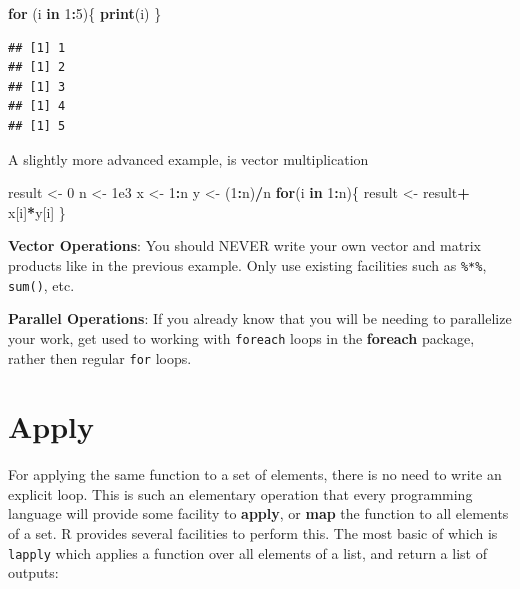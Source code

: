 \documentclass[]{book}
\newenvironment{Shaded}{\begin{snugshade}}{\end{snugshade}}
\newcommand{\ControlFlowTok}[1]{\textcolor[rgb]{0.13,0.29,0.53}{\textbf{#1}}}
\newcommand{\DecValTok}[1]{\textcolor[rgb]{0.00,0.00,0.81}{#1}}
\newcommand{\FloatTok}[1]{\textcolor[rgb]{0.00,0.00,0.81}{#1}}
\newcommand{\KeywordTok}[1]{\textcolor[rgb]{0.13,0.29,0.53}{\textbf{#1}}}
\newcommand{\NormalTok}[1]{#1}
\newcommand{\OperatorTok}[1]{\textcolor[rgb]{0.81,0.36,0.00}{\textbf{#1}}}
\newcommand{\StringTok}[1]{\textcolor[rgb]{0.31,0.60,0.02}{#1}}
\theoremstyle{definition}
\theoremstyle{definition}
\theoremstyle{definition}
\theoremstyle{remark}
\let\BeginKnitrBlock\begin \let\EndKnitrBlock\end
\begin{document}
\begin{Shaded}
\begin{Highlighting}[]
\ControlFlowTok{for}\NormalTok{ (i }\ControlFlowTok{in} \DecValTok{1}\OperatorTok{:}\DecValTok{5}\NormalTok{)\{}
    \KeywordTok{print}\NormalTok{(i)}
\NormalTok{    \}}
\end{Highlighting}
\end{Shaded}

\begin{verbatim}
## [1] 1
## [1] 2
## [1] 3
## [1] 4
## [1] 5
\end{verbatim}

A slightly more advanced example, is vector multiplication

\begin{Shaded}
\begin{Highlighting}[]
\NormalTok{result <-}\StringTok{ }\DecValTok{0}
\NormalTok{n <-}\StringTok{ }\FloatTok{1e3}
\NormalTok{x <-}\StringTok{ }\DecValTok{1}\OperatorTok{:}\NormalTok{n}
\NormalTok{y <-}\StringTok{ }\NormalTok{(}\DecValTok{1}\OperatorTok{:}\NormalTok{n)}\OperatorTok{/}\NormalTok{n}
\ControlFlowTok{for}\NormalTok{(i }\ControlFlowTok{in} \DecValTok{1}\OperatorTok{:}\NormalTok{n)\{}
\NormalTok{  result <-}\StringTok{ }\NormalTok{result}\OperatorTok{+}\StringTok{ }\NormalTok{x[i]}\OperatorTok{*}\NormalTok{y[i]}
\NormalTok{\}}
\end{Highlighting}
\end{Shaded}

\BeginKnitrBlock{remark}
{}\textbf{Vector Operations}:
You should NEVER write your own vector and matrix products like in the previous example. Only use existing facilities such as \texttt{\%*\%}, \texttt{sum()}, etc.
\EndKnitrBlock{remark}

\BeginKnitrBlock{remark}
{}\textbf{Parallel Operations}:
If you already know that you will be needing to parallelize your work, get used to working with \texttt{foreach} loops in the \textbf{foreach} package, rather then regular \texttt{for} loops.
\EndKnitrBlock{remark}

\hypertarget{apply}{%
\section{Apply}\label{apply}}

For applying the same function to a set of elements, there is no need to write an explicit loop.
This is such an elementary operation that every programming language will provide some facility to \textbf{apply}, or \textbf{map} the function to all elements of a set.
R provides several facilities to perform this.
The most basic of which is \texttt{lapply} which applies a function over all elements of a list, and return a list of outputs:
\end{document}
